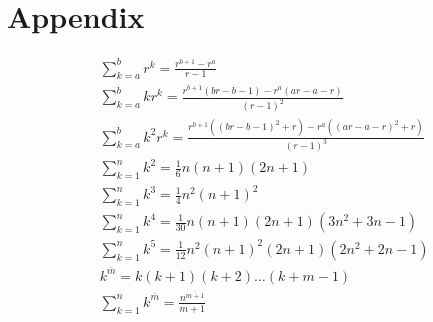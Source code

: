 \documentclass[a4paper,twocolumn,10pt]{article}
\begin{document}
\section{Appendix}
\begin{align*}
        &\sum_{k=a}^br^k=\frac{r^{b+1}-r^a}{r-1}\\
        &\sum_{k=a}^bkr^k=\frac{r^{b+1}(br-b-1)-r^a(ar-a-r)}{(r-1)^2}\\
        &\sum_{k=a}^bk^2r^k=\frac{r^{b+1}((br-b-1)^2+r)-r^a((ar-a-r)^2+r)}{(r-1)^3}\\
        &\sum_{k=1}^nk^2=\frac{1}{6}n(n+1)(2n+1)\\
        &\sum_{k=1}^nk^3=\frac{1}{4}n^2(n+1)^2\\
        &\sum_{k=1}^nk^4=\frac{1}{30}n(n+1)(2n+1)(3n^2+3n-1)\\
        &\sum_{k=1}^nk^5=\frac{1}{12}n^2(n+1)^2(2n+1)(2n^2+2n-1)\\
        &k^{\overline{m}}=k(k+1)(k+2)\dots(k+m-1)\\
        &\sum_{k=1}^nk^{\overline{m}}=\frac{n^{\overline{m+1}}}{m+1}\\
\end{align*}
\end{document}
